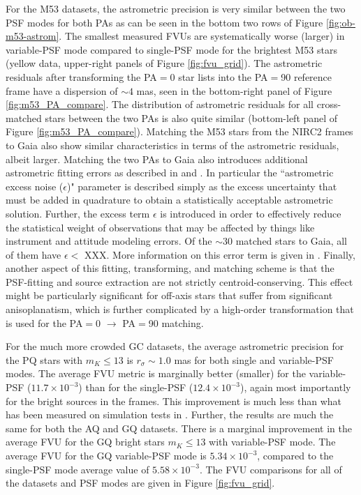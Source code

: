 \documentclass[]{spie}  %
\begin{document}
\indent For the M53 datasets, the astrometric precision is very similar between the two PSF modes for both PAs as can be seen in the bottom two rows of Figure \ref{fig:ob-m53-astrom}. The smallest measured FVUs are systematically worse (larger) in variable-PSF mode compared to single-PSF mode for the brightest M53 stars (yellow data, upper-right panels of Figure \ref{fig:fvu_grid}). The astrometric residuals after transforming the PA$=$0 star lists into the PA$=$90 reference frame have a dispersion of ${\sim}4$ mas, seen in the bottom-right panel of Figure \ref{fig:m53_PA_compare}. The distribution of astrometric residuals for all cross-matched stars between the two PAs is also quite similar (bottom-left panel of Figure \ref{fig:m53_PA_compare}). Matching the M53 stars from the NIRC2 frames to Gaia also show similar characteristics in terms of the astrometric residuals, albeit larger. Matching the two PAs to Gaia also introduces additional astrometric fitting errors as described in \cite{brown:2018a} and \cite{brown:2021a}. In particular the ``astrometric excess noise ($\epsilon$)" parameter is described simply as the excess uncertainty that must be added in quadrature to obtain a statistically acceptable astrometric solution. Further, the excess term $\epsilon$ is introduced in order to effectively reduce the statistical weight of observations that may be affected by things like instrument and attitude modeling errors. Of the ${\sim}$30 matched stars to Gaia, all of them have $\epsilon < $ XXX. More information on this error term is given in \cite{lindegren:2012a}. Finally, another aspect of this fitting, transforming, and matching scheme is that the PSF-fitting and source extraction are not strictly centroid-conserving. This effect might be particularly significant for off-axis stars that suffer from significant anisoplanatism, which is further complicated by a high-order transformation that is used for the PA$=$0 $\rightarrow$ PA$=$90 matching.

\indent For the much more crowded GC datasets, the average astrometric precision for the PQ stars with $m_{K} \leq 13$ is $r_{\sigma}{\sim}1.0$ mas for both single and variable-PSF modes. The average FVU metric is marginally better (smaller) for the variable-PSF ($11.7\times10^{-3}$) than for the single-PSF ($12.4\times10^{-3}$), again most importantly for the bright sources in the frames. This improvement is much less than what has been measured on simulation tests in \cite{Turri:inprep}. Further, the results are much the same for both the AQ and GQ datasets. There is a marginal improvement in the average FVU for the GQ bright stars $m_{K} \leq 13$ with variable-PSF mode. The average FVU for the GQ variable-PSF mode is $5.34\times10^{-3}$, compared to the single-PSF mode average value of $5.58\times10^{-3}$. The FVU comparisons for all of the datasets and PSF modes are given in Figure \ref{fig:fvu_grid}.
\end{document}
